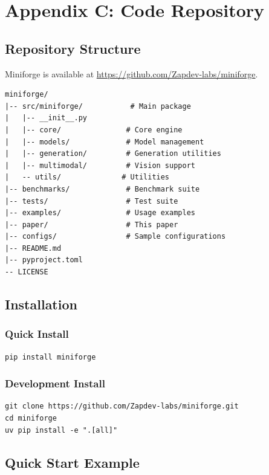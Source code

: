 \section{Appendix C: Code Repository}
\label{appendix:code}

\subsection{Repository Structure}

Miniforge is available at \url{https://github.com/Zapdev-labs/miniforge}.

\begin{verbatim}
miniforge/
|-- src/miniforge/           # Main package
|   |-- __init__.py
|   |-- core/               # Core engine
|   |-- models/             # Model management
|   |-- generation/         # Generation utilities
|   |-- multimodal/         # Vision support
|   -- utils/              # Utilities
|-- benchmarks/             # Benchmark suite
|-- tests/                  # Test suite
|-- examples/               # Usage examples
|-- paper/                  # This paper
|-- configs/                # Sample configurations
|-- README.md
|-- pyproject.toml
-- LICENSE
\end{verbatim}

\subsection{Installation}

\subsubsection{Quick Install}

\begin{verbatim}
pip install miniforge
\end{verbatim}

\subsubsection{Development Install}

\begin{verbatim}
git clone https://github.com/Zapdev-labs/miniforge.git
cd miniforge
uv pip install -e ".[all]"
\end{verbatim}

\subsection{Quick Start Example}

